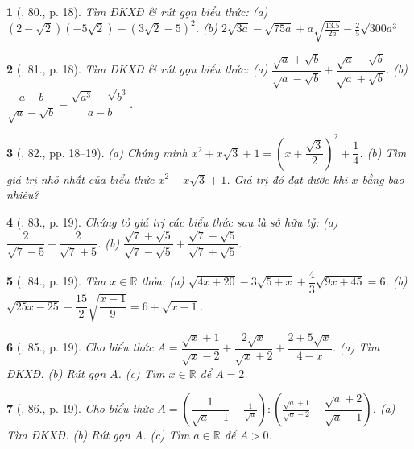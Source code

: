 \documentclass{article}
\newtheorem{baitoan}{}
\begin{document}
\begin{baitoan}[\cite{SBT_Toan_9_tap_1}, 80., p. 18]
	Tìm ĐKXĐ \& rút gọn biểu thức: (a) $(2 - \sqrt{2})(-5\sqrt{2}) - (3\sqrt{2} - 5)^2$. (b) $2\sqrt{3a} - \sqrt{75a} + a\sqrt{\frac{13.5}{2a}} - \frac{2}{5}\sqrt{300a^3}$
\end{baitoan}

\begin{baitoan}[\cite{SBT_Toan_9_tap_1}, 81., p. 18]
	Tìm ĐKXĐ \& rút gọn biểu thức: (a) $\dfrac{\sqrt{a} + \sqrt{b}}{\sqrt{a} - \sqrt{b}} + \dfrac{\sqrt{a} - \sqrt{b}}{\sqrt{a} + \sqrt{b}}$. (b) $\dfrac{a - b}{\sqrt{a} - \sqrt{b}} - \dfrac{\sqrt{a^3} - \sqrt{b^3}}{a - b}$.
\end{baitoan}

\begin{baitoan}[\cite{SBT_Toan_9_tap_1}, 82., pp. 18--19]
	(a) Chứng minh $x^2 + x\sqrt{3} + 1 = \left(x + \dfrac{\sqrt{3}}{2}\right)^2 + \dfrac{1}{4}$. (b) Tìm giá trị nhỏ nhất của biểu thức $x^2 + x\sqrt{3} + 1$. Giá trị đó đạt được khi $x$ bằng bao nhiêu?
\end{baitoan}

\begin{baitoan}[\cite{SBT_Toan_9_tap_1}, 83., p. 19]
	Chứng tỏ giá trị các biểu thức sau là số hữu tỷ: (a) $\dfrac{2}{\sqrt{7} - 5} - \dfrac{2}{\sqrt{7} + 5}$. (b) $\dfrac{\sqrt{7} + \sqrt{5}}{\sqrt{7} - \sqrt{5}} + \dfrac{\sqrt{7} - \sqrt{5}}{\sqrt{7} + \sqrt{5}}$.
\end{baitoan}

\begin{baitoan}[\cite{SBT_Toan_9_tap_1}, 84., p. 19]
	Tìm $x\in\mathbb{R}$ thỏa: (a) $\sqrt{4x + 20} - 3\sqrt{5 + x} + \dfrac{4}{3}\sqrt{9x + 45} = 6$. (b) $\sqrt{25x - 25} - \dfrac{15}{2}\sqrt{\dfrac{x - 1}{9}} = 6 + \sqrt{x - 1}$.
\end{baitoan}

\begin{baitoan}[\cite{SBT_Toan_9_tap_1}, 85., p. 19]
	Cho biểu thức $A = \dfrac{\sqrt{x} + 1}{\sqrt{x} - 2} + \dfrac{2\sqrt{x}}{\sqrt{x} + 2} + \dfrac{2 + 5\sqrt{x}}{4 - x}$. (a) Tìm ĐKXĐ. (b) Rút gọn $A$. (c) Tìm $x\in\mathbb{R}$ để $A = 2$. 
\end{baitoan}

\begin{baitoan}[\cite{SBT_Toan_9_tap_1}, 86., p. 19]
	Cho biểu thức $A = \left(\dfrac{1}{\sqrt{a} - 1} - \frac{1}{\sqrt{a}}\right):\left(\frac{\sqrt{a} + 1}{\sqrt{a} - 2} - \dfrac{\sqrt{a} + 2}{\sqrt{a} - 1}\right)$. (a) Tìm ĐKXĐ. (b) Rút gọn $A$. (c) Tìm $a\in\mathbb{R}$ để $A > 0$.
\end{baitoan}
\end{document}
